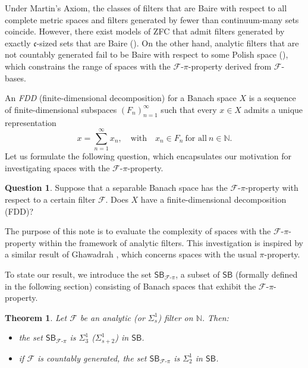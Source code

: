 \documentclass[12pt,fleqn]{amsart}
\newcommand{\FF}{\mathscr{F}}
\newcounter{maintheorem}
\newtheorem{mainth}[maintheorem]{Theorem}
\theoremstyle{definition}
\newtheorem{question}[theorem]{Question}
\theoremstyle{remark}
\begin{document}
Under Martin's Axiom, the classes of filters that are Baire with respect to all complete metric spaces and filters generated by fewer than continuum-many sets coincide. However, there exist models of ZFC that admit filters generated by exactly \(\mathfrak{c}\)-sized sets that are Baire (\cite[Section 5]{avilesetal}). On the other hand, analytic filters that are not countably generated fail to be Baire with respect to some Polish space (\cite[Proposition 4.1]{avilesetal}), which constrains the range of spaces with the \(\mathcal{F}\)-\(\mathcal{\pi}\)-property derived from \(\mathcal{F}\)-bases. \smallskip

An \emph{FDD} (finite-dimensional decomposition) for a Banach space \(X\) is a sequence of finite-dimensional subspaces \((F_n)_{n=1}^\infty\) such that every \(x \in X\) admits a unique representation
\[
    x = \sum_{n=1}^\infty x_n, \quad \text{with} \quad x_n \in F_n \ \text{for all} \ n \in \mathbb{N}.
\]
Let us formulate the following question, which encapsulates our motivation for investigating spaces with the \(\mathcal{F}\)-\(\mathcal{\pi}\)-property.

\begin{question}\label{q:1}
    Suppose that a separable Banach space has the \(\mathcal{F}\)-\(\mathcal{\pi}\)-property with respect to a certain filter \(\FF\). Does \( X \) have a finite-dimensional decomposition (FDD)?
\end{question}

The purpose of this note is to evaluate the complexity of spaces with the \(\mathcal{F}\)-\(\mathcal{\pi}\)-property within the framework of analytic filters. This investigation is inspired by a similar result of Ghawadrah \cite{GhaFund}, which concerns spaces with the usual \(\pi\)-property.

To state our result, we introduce the set \(\mathsf{SB}_{\mathcal{F}\text{-}\pi}\), a subset of \(\mathsf{SB}\) (formally defined in the following section) consisting of Banach spaces that exhibit the \(\mathcal{F}\)-\(\mathcal{\pi}\)-property.


\begin{mainth}\label{Th:A}Let $\FF$ be an analytic (or $\Sigma^1_{s}$) filter on $\mathbb N$. Then:
\begin{itemize}
    \item the set $\mathsf{SB}_{\mathcal{F}\text{-}\pi}$ is $\Sigma_3^1$ ($\Sigma_{s+2}^1$) in $\mathsf{SB}$.
    \item if $\FF$ is countably generated, the set $\mathsf{SB}_{\mathcal{F}\text{-}\pi}$ is $\Sigma^1_2$ in $\mathsf{SB}$.
\end{itemize}
\end{mainth}
\end{document}
